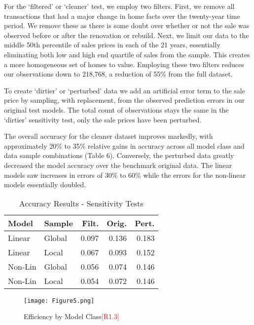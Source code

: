 \documentclass[colTwo]{anon}
\theoremstyle{definition}
\begin{document}
For the ‘filtered’ or ‘cleaner’ test, we employ two filters.  First, we remove all transactions that had a major change in home facts over the twenty-year time period.  We remove these as there is some doubt over whether or not the sale was observed before or after the renovation or rebuild. Next, we limit our data to the middle 50th percentile of sales prices in each of the 21 years, essentially eliminating both low and high end quartile of sales from the sample.  This creates a more homogeneous set of homes to value.  Employing these two filters reduces our observations down to 218,768, a reduction of 55\% from the full dataset. 

To create  ‘dirtier’ or ‘perturbed’ data we add an artificial error term to the sale price by sampling, with replacement, from the observed prediction errors in our original test models. The total count of observations stays the same in the ‘dirtier’ sensitivity test, only the sale prices have been perturbed. 

The overall accuracy for the cleaner dataset improves markedly, with approximately 20\% to 35\% relative gains in accuracy across all model class and data sample combinations (Table 6).  Conversely, the perturbed data greatly decreased the model accuracy over the benchmark original data.  The linear models saw increases in errors of 30\% to 60\% while the errors for the non-linear models essentially doubled.  

\begin{table}[h]
\centering
\begin{tabular}{l|l|r|r|r}
\hline
\textbf{Model} & \textbf{Sample} & \textbf{Filt.} & \textbf{Orig.} & \textbf{Pert.}\\
\hline
Linear & Global & 0.097 & 0.136 & 0.183\\
Linear & Local & 0.067 & 0.093 & 0.152\\
\hline
Non-Lin & Global & 0.056 & 0.074 & 0.146\\
Non-Lin & Local & 0.054 & 0.072 & 0.146\\
\hline
\end{tabular}
\caption{Accuracy Results - Sensitivity Tests}
\label{table:6}
\end{table}

\begin{figure*}[h!]
\centering
\texttt{[image: Figure5.png]}
\caption{Efficiency by Model Class\textcolor{red}{[R1.3]}}
\label{fig:effmod}
\end{figure*}
\end{document}
